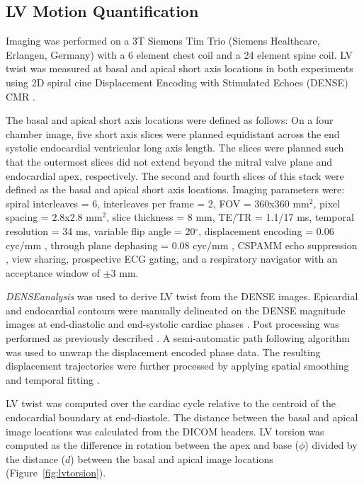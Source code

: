 \subsection{LV Motion Quantification}
	Imaging was performed on a 3T Siemens Tim Trio (Siemens Healthcare, Erlangen, Germany) with a 6 element chest coil and a 24 element spine coil. LV twist was measured at basal and apical short axis locations in both experiments using 2D spiral cine Displacement Encoding with Stimulated Echoes (DENSE) CMR \cite{Zhong2010,Wehner2015}.
	
	The basal and apical short axis locations were defined as follows: On a four chamber image, five short axis slices were planned equidistant across the end systolic endocardial ventricular long axis length. The slices were planned such that the outermost slices did not extend beyond the mitral valve plane and endocardial apex, respectively. The second and fourth slices of this stack were defined as the basal and apical short axis locations. Imaging parameters were: spiral interleaves = 6, interleaves per frame = 2, FOV = 360x360 mm$^2$, pixel spacing = 2.8x2.8 mm$^2$, slice thickness = 8 mm, TE/TR = 1.1/17 ms, temporal resolution = 34 ms, variable flip angle = 20$^{\circ}$, displacement encoding = 0.06 cyc/mm \cite{Wehner2015a}, through plane dephasing = 0.08 cyc/mm \cite{Zhong2006}, CSPAMM echo suppression \cite{Kim2004}, view sharing, prospective ECG gating, and a respiratory navigator with an acceptance window of $\pm$3 mm.
	
	\textit{DENSEanalysis} \cite{Gilliam2016a} was used to derive LV twist from the DENSE images. Epicardial and endocardial contours were manually delineated on the DENSE magnitude images at end-diastolic and end-systolic cardiac phases \cite{Suever2014}. Post processing was performed as previously described \cite{Suever2014}. A semi-automatic path following algorithm was used to unwrap the displacement encoded phase data. The resulting displacement trajectories were further processed by applying spatial smoothing and temporal fitting \cite{Spottiswoode2007}.
	
	LV twist was computed over the cardiac cycle relative to the centroid of the endocardial boundary at end-diastole. The distance between the basal and apical image locations was calculated from the DICOM headers. LV torsion was computed as the difference in rotation between the apex and base ($\phi$) divided by the distance ($d$) between the basal and apical image locations \cite{Donekal2013a,Phan2009a,Sorger2003a} (Figure~\ref{fig:lvtorsion}).


